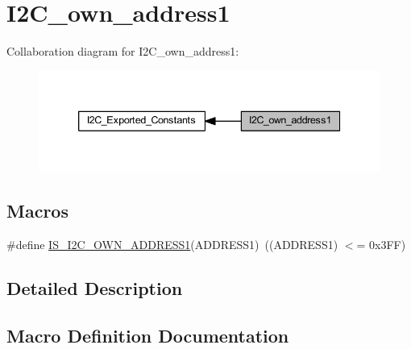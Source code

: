 \hypertarget{group___i2_c__own__address1}{}\section{I2\+C\+\_\+own\+\_\+address1}
\label{group___i2_c__own__address1}
Collaboration diagram for I2\+C\+\_\+own\+\_\+address1\+:
\nopagebreak
\begin{figure}[H]
\begin{center}
\leavevmode
\includegraphics[width=339pt]{group___i2_c__own__address1}
\end{center}
\end{figure}
\subsection*{Macros}
\begin{DoxyCompactItemize}
\item 
\#define \hyperlink{group___i2_c__own__address1_gad84e8b9523d45b6105b4d5cb68994a79}{I\+S\+\_\+\+I2\+C\+\_\+\+O\+W\+N\+\_\+\+A\+D\+D\+R\+E\+S\+S1}(A\+D\+D\+R\+E\+S\+S1)~((A\+D\+D\+R\+E\+S\+S1) $<$= 0x3\+F\+F)
\end{DoxyCompactItemize}


\subsection{Detailed Description}


\subsection{Macro Definition Documentation}
\mbox{\label{group___i2_c__own__address1_gad84e8b9523d45b6105b4d5cb68994a79}} 
